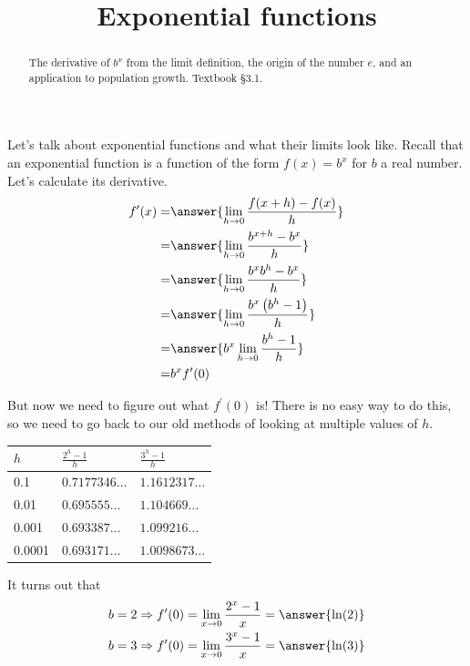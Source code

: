 \documentclass{ximera}
\title{Exponential functions}
\begin{document}
\begin{abstract}
The derivative of $b^{x}$ from the limit definition, the origin of the number $e$, and an application to population growth. Textbook §3.1.
\end{abstract}
\maketitle

Let's talk about exponential functions and what their limits look like. Recall that an exponential function is a function of the form $f(x)=b^{x}$ for $b$ a real number. Let's calculate its derivative.
\[
\begin{aligned}
f^{\prime}(x)= & \answer{\lim _{h \rightarrow 0} \frac{f(x+h)-f(x)}{h}} \\
= & \answer{\lim _{h \rightarrow 0} \frac{b^{x+h}-b^{x}}{h}} \\
= & \answer{\lim _{h \rightarrow 0} \frac{b^{x} b^{h}-b^{x}}{h}} \\
= & \answer{\lim _{h \rightarrow 0} \frac{b^{x}\left(b^{h}-1\right)}{h}} \\
= & \answer{b^{x} \lim _{h \rightarrow 0} \frac{b^{h}-1}{h}} \\
= & b^{x} f^{\prime}(0)
\end{aligned}
\]

But now we need to figure out what $f^{\prime}(0)$ is! There is no easy way to do this, so we need to go back to our old methods of looking at multiple values of $h$.

\begin{center}
\begin{tabular}[t]{|l|l|l|}
\hline
$h$ & $\frac{2^{h}-1}{h}$ & $\frac{3^{h}-1}{h}$ \\
\hline
0.1 & $0.7177346 \ldots$ & $1.1612317 \ldots$ \\
\hline
0.01 & $0.695555 \ldots$ & $1.104669 \ldots$ \\
\hline
0.001 & $0.693387 \ldots$ & $1.099216 \ldots$ \\
\hline
0.0001 & $0.693171 \ldots$ & $1.0098673 \ldots$ \\
\hline
\end{tabular}
\end{center}

It turns out that
\[
\begin{aligned}
& b=2 \Rightarrow f^{\prime}(0)=\lim _{x \rightarrow 0} \frac{2^{x}-1}{x}=\answer{\ln(2)} \\
& b=3 \Rightarrow f^{\prime}(0)=\lim _{x \rightarrow 0} \frac{3^{x}-1}{x}=\answer{\ln(3)}
\end{aligned}
\]
\end{document}
